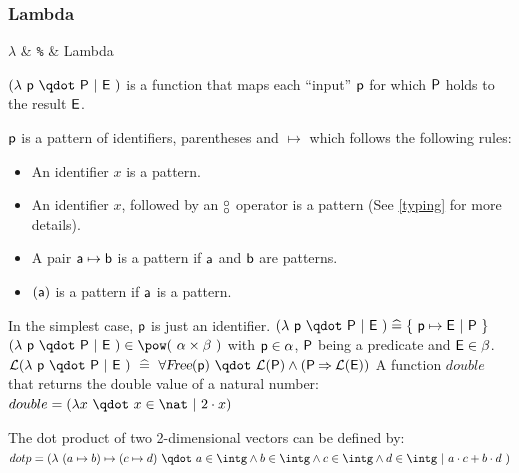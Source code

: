\begin{samepage}
\subsubsection{Lambda}
\label{lambda}

\begin{rrnames}
  $\lambda$  & \texttt{\%}  & Lambda
\end{rrnames}
\begin{rodinrefentry}
  \rrdesc
    $(\lambda~\exprlp~\qdot~\predp~|~\expre~)$ is a function that maps each ``input'' $\textsf{p}$ for which $\textsf{P}$ holds to
    the result $\textsf{E}$. 

    $\textsf{p}$ is a pattern of identifiers, parentheses and $\mapsto$ which follows the
    following rules:
    \begin{itemize}
    \item An identifier $x$ is a pattern.
    \item An identifier $x$, followed by an $\boftype$ operator is a pattern (See \ref{typing}
      for more details).
    \item A pair $\textsf{a}\mapsto\textsf{b}$ is a pattern if $\textsf{a}$ and $\textsf{b}$ are patterns.
    \item $(\textsf{a})$ is a pattern if $\textsf{a}$ is a pattern.
    \end{itemize}
    In the simplest case, $\textsf{p}$ is just an identifier.
  \rrdef
    $(\lambda~\exprlp~\qdot~\predp~|~\expre~) \defi \{~\exprlp\mapsto \expre~|~\predp~\}$
  \rrtypes
    $(\lambda~\exprlp~\qdot~\predp~|~\expre~)\in\pow(~\alpha\cprod\beta~)$
    with $\textsf{p}\in\alpha$, $\textsf{P}$ being a predicate and $\textsf{E}\in\beta$.
  \rrwd
    $\wdl(\lambda~\exprlp~\qdot~\predp~|~\expre~)~\defi~
    \forall \freeids{\exprlp}~\qdot~\wdl(\predp)\land (\predp\limp \wdl(\expre))$
  \rrex
    A function $double$ that returns the double value of a natural number:\\
    $double = (\lambda x~\qdot~x\in\nat~|~2\cdot x)$

    The dot product of two 2-dimensional vectors can be defined by:\\
    $dotp = (\lambda~(a \mapsto b)\mapsto(c \mapsto d)~\qdot~a\in\intg\land  b\in\intg\land  c\in\intg\land  d\in\intg~|~a\cdot c+b\cdot d~)$
\end{rodinrefentry}
\end{samepage}
\clearpage

